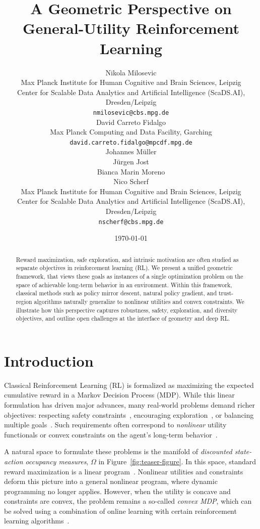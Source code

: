 \documentclass{article}
\title{A Geometric Perspective on General-Utility Reinforcement Learning}
\date{\today} 					%
\author{Nikola Milosevic \\
Max Planck Institute for Human Cognitive and Brain Sciences, Leipzig\\
Center for Scalable Data Analytics and Artificial Intelligence (ScaDS.AI), Dresden/Leipzig\\
\texttt{nmilosevic@cbs.mpg.de} \\
\And
David Carreto Fidalgo \\
Max Planck Computing and Data Facility, Garching\\
\texttt{david.carreto.fidalgo@mpcdf.mpg.de} \\
\And
Johannes Müller \\
\And
Jürgen Jost \\
\And
Bianca Marin Moreno \\
\And
Nico Scherf \\
Max Planck Institute for Human Cognitive and Brain Sciences, Leipzig\\
Center for Scalable Data Analytics and Artificial Intelligence (ScaDS.AI), Dresden/Leipzig\\
\texttt{nscherf@cbs.mpg.de} \\
}
\theoremstyle{plain}
\theoremstyle{definition}
\theoremstyle{remark}
\begin{document}
\maketitle


\begin{abstract}
Reward maximization, safe exploration, and intrinsic motivation are often studied as separate objectives in reinforcement learning (RL). 
We present a unified geometric framework, that views these goals as instances of a single optimization problem on the space of achievable long-term behavior in an environment. 
Within this framework, classical methods such as policy mirror descent, natural policy gradient, and trust-region algorithms naturally generalize to nonlinear utilities and convex constraints. 
We illustrate how this perspective captures robustness, safety, exploration, and diversity objectives, and outline open challenges at the interface of geometry and deep RL.
\end{abstract}

\section{Introduction}
Classical Reinforcement Learning (RL) is formalized as maximizing the expected cumulative reward in a Markov Decision Process (MDP). While this linear formulation has driven major advances, many real-world problems demand richer objectives: respecting safety constraints~\citep{dai2023saferlhfsafereinforcement}, encouraging exploration~\citep{hazan2019provably}, or balancing multiple goals~\citep{sun2024prompt, kolev2025dual, grillotti2024quality}. 
Such requirements often correspond to \emph{nonlinear} utility functionals or convex constraints on the agent's long-term behavior~\citep{zhang2020variational,zahavy2021reward}.

A natural space to formulate these problems is the manifold of \emph{discounted state-action occupancy measures}, $\Omega$ in Figure~\ref{fig:teaser-figure}. 
In this space, standard reward maximization is a linear program~\citep{Altman1999ConstrainedMD, puterman2014markov}.
Nonlinear utilities and constraints deform this picture into a general nonlinear program, where dynamic programming no longer applies. 
However, when the utility is concave and constraints are convex, the problem remains a so-called \emph{convex MDP}, which can be solved using a combination of online learning with certain reinforcement learning algorithms~\citep{zhang2020variational, zahavy2021reward}.
\end{document}
